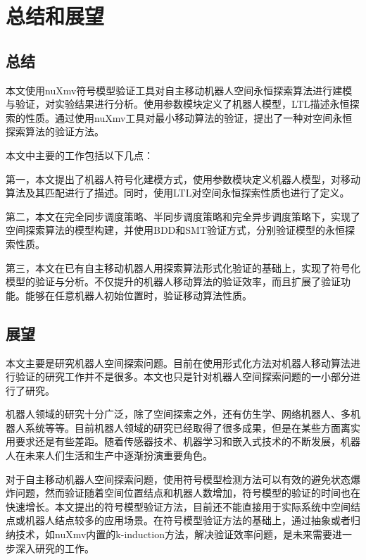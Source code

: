 \chapter{总结和展望}

\section{总结}
本文使用nuXmv符号模型验证工具对自主移动机器人空间永恒探索算法进行建模与验证，对实验结果进行分析。使用参数模块定义了机器人模型，LTL描述永恒探索的性质。通过使用nuXmv工具对最小移动算法的验证，提出了一种对空间永恒探索算法的验证方法。

本文中主要的工作包括以下几点：

第一，本文提出了机器人符号化建模方式，使用参数模块定义机器人模型，对移动算法及其匹配进行了描述。同时，使用LTL对空间永恒探索性质也进行了定义。

第二，本文在完全同步调度策略、半同步调度策略和完全异步调度策略下，实现了空间探索算法的模型构建，并使用BDD和SMT验证方式，分别验证模型的永恒探索性质。

第三，本文在已有自主移动机器人用探索算法形式化验证的基础上，实现了符号化模型的验证与分析。不仅提升的机器人移动算法的验证效率，而且扩展了验证功能。能够在任意机器人初始位置时，验证移动算法性质。

\section{展望}
本文主要是研究机器人空间探索问题。目前在使用形式化方法对机器人移动算法进行验证的研究工作并不是很多。本文也只是针对机器人空间探索问题的一小部分进行了研究。

机器人领域的研究十分广泛，除了空间探索之外，还有仿生学、网络机器人、多机器人系统等等。目前机器人领域的研究已经取得了很多成果，但是在某些方面离实用要求还是有些差距。随着传感器技术、机器学习和嵌入式技术的不断发展，机器人在未来人们生活和生产中逐渐扮演重要角色。

对于自主移动机器人空间探索问题，使用符号模型检测方法可以有效的避免状态爆炸问题，然而验证随着空间位置结点和机器人数增加，符号模型的验证的时间也在快速增长。本文提出的符号模型验证方法，目前还不能直接用于实际系统中空间结点或机器人结点较多的应用场景。在符号模型验证方法的基础上，通过抽象或者归纳技术，如nuXmv内置的k-induction方法，解决验证效率问题，是未来需要进一步深入研究的工作。

